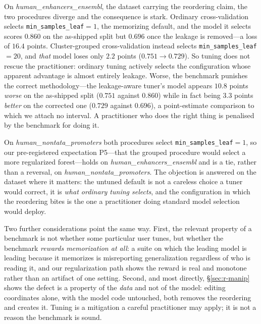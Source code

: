\documentclass[webpdf,modern,large,namedate]{oup-authoring-template}%
\begin{document}
On \textit{human\_enhancers\_ensembl}, the dataset carrying the reordering claim, the two procedures diverge and the consequence is stark. Ordinary cross-validation selects \texttt{min\_samples\_leaf}$=1$, the memorizing default, and the model it selects scores $0.860$ on the as-shipped split but $0.696$ once the leakage is removed---a loss of $16.4$ points. Cluster-grouped cross-validation instead selects \texttt{min\_samples\_leaf}$=20$, and \emph{that} model loses only $2.2$ points ($0.751\to0.729$). So tuning does not rescue the practitioner: ordinary tuning actively selects the configuration whose apparent advantage is almost entirely leakage. Worse, the benchmark punishes the correct methodology---the leakage-aware tuner's model appears $10.8$ points \emph{worse} on the as-shipped split ($0.751$ against $0.860$) while in fact being $3.3$ points \emph{better} on the corrected one ($0.729$ against $0.696$), a point-estimate comparison to which we attach no interval. A practitioner who does the right thing is penalised by the benchmark for doing it.

On \textit{human\_nontata\_promoters} both procedures select \texttt{min\_samples\_leaf}$=1$, so our pre-registered expectation P5---that the grouped procedure would select a more regularized forest---holds on \textit{human\_enhancers\_ensembl} and is a tie, rather than a reversal, on \textit{human\_nontata\_promoters}. The objection is answered on the dataset where it matters: the untuned default is not a careless choice a tuner would correct, it is \emph{what ordinary tuning selects}, and the configuration in which the reordering bites is the one a practitioner doing standard model selection would deploy.

Two further considerations point the same way. First, the relevant property of a benchmark is not whether some particular user tunes, but whether the benchmark \emph{rewards memorization at all}: a suite on which the leading model is leading because it memorizes is misreporting generalization regardless of who is reading it, and our regularization path shows the reward is real and monotone rather than an artifact of one setting. Second, and most directly, \S\ref{sec:r-manip} shows the defect is a property of the \emph{data} and not of the model: editing coordinates alone, with the model code untouched, both removes the reordering and creates it. Tuning is a mitigation a careful practitioner may apply; it is not a reason the benchmark is sound.
\end{document}
